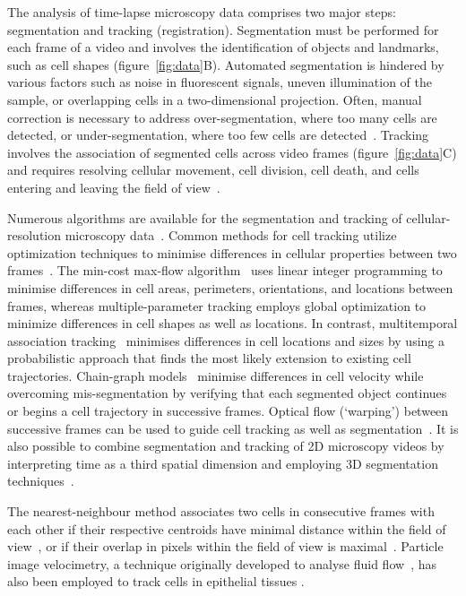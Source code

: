 \documentclass[a4paper,11pt]{article}
\begin{document}
The analysis of time-lapse microscopy data comprises two major steps: segmentation and tracking (registration). Segmentation must be performed for each frame of a video and involves the identification of objects and landmarks, such as cell shapes (figure~\ref{fig:data}B). 
Automated segmentation is hindered by various factors such as noise in fluorescent signals, uneven illumination of the sample, or overlapping cells in a two-dimensional projection. 
Often, manual correction is necessary to address over-segmentation, where too many cells are detected, or under-segmentation, where too few cells are detected~\cite{Mashburn2012, Cilla2015, Schiegg2013}. 
Tracking involves the association of segmented cells across video frames (figure~\ref{fig:data}C) and requires resolving cellular movement, cell division, cell death, and cells entering and leaving the field of view~\cite{Schiegg2013}.

Numerous algorithms are available for the segmentation and tracking of cellular-resolution microscopy data~\cite{Mashburn2012,Cilla2015,Heller2016}. 
Common methods for cell tracking utilize optimization techniques to minimise differences in cellular properties between two frames~\cite{Padfield2011, Cilla2015, Youssef2011, Wait2014, Winter2011}. 
The min-cost max-flow algorithm~\cite{Padfield2011} uses linear integer programming to minimise differences in cell areas, perimeters, orientations, and locations between frames, whereas multiple-parameter tracking \cite{Youssef2011} employs global optimization to minimize differences in cell shapes as well as locations. 
In contrast, multitemporal association tracking~\cite{Wait2014,Winter2011} minimises differences in cell locations and sizes by using a probabilistic approach that finds the most likely extension to existing cell trajectories. 
Chain-graph models~\cite{Sommer2011} minimise differences in cell velocity while overcoming mis-segmentation by verifying that each segmented object continues or begins a cell trajectory in successive frames. 
Optical flow (`warping') between successive frames can be used to guide cell tracking as well as segmentation~\cite{Liu2014}.
It is also possible to combine segmentation and tracking of 2D microscopy videos by interpreting time as a third spatial dimension and employing 3D segmentation techniques~\cite{Bellaiche2011}. 

The nearest-neighbour method associates two cells in consecutive frames with each other if their respective centroids have minimal distance within the field of view~\cite{Mashburn2012}, or if their overlap in pixels within the field of view is maximal~\cite{Aly2014, Wang2010}. 
Particle image velocimetry, a technique originally developed to analyse fluid flow~\cite{Raffel2007}, has also been employed to track cells in epithelial tissues \cite{Puliafito2012}. 
\end{document}
